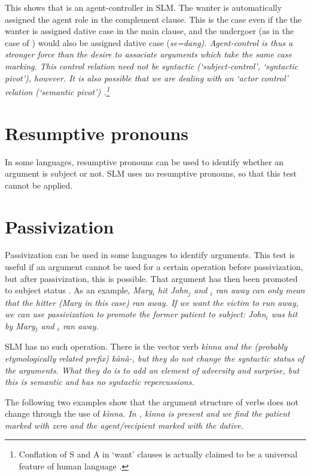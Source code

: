 This shows that  is an agent-controller in SLM. The wanter is automatically assigned the agent role in the complement clause. This is the case even if the the wanter is assigned dative case in the main clause, and the undergoer (as in the case of ) would also be assigned dative case (\em se=dang\em). Agent-control is thus a stronger force than the desire to associate arguments which take the same case marking. This control relation need not be syntactic (`subject-control', `syntactic pivot'), however. It is also possible that we are dealing with an `actor control' relation (`semantic pivot') \citep[cf.][257]{VanValinEtAl1997rrg}.\footnote{Conflation of S and A in `want' clauses is actually claimed to be a universal feature of human language \citep{Dixon1979}.}

\section{Resumptive pronouns}\label{sec:grel:Resumptivepronouns}
In some languages, resumptive pronouns can be used to identify whether an argument is subject or not. SLM uses no resumptive pronouns, so that this test cannot be applied.

\section{Passivization}\label{sec:grel:Passivization}
Passivization can be used in some languages to identify arguments. This test is useful if an argument cannot be used for a certain operation before passivization, but after passivization, this is possible. That argument has then been promoted to subject status \citep[306]{FoleyEtAl1985infpack}. As an example, \em Mary$_i$ hit John$_j$ and \zero{}$_i$ ran away \em can only mean that the hitter (\em Mary \em in this case) ran away. If we want the victim to run away, we can use passivization to promote the former patient to subject: \em John$_i$  was hit by Mary$_j$ and \zero{}$_i$ ran away\em.

SLM has no such operation. There is the vector verb \em kìnna \em and the (probably etymologically related prefix) \em kànà-\em, but they do not change the syntactic status of the arguments. What they do is to add an element of adversity and surprise, but this is semantic and has no syntactic repercussions.

The following two examples show that the argument structure of verbs does not change through the use of \em kìnna\em. In , \em kìnna \em is present and we find the patient marked with zero and the agent/recipient marked with the dative.


